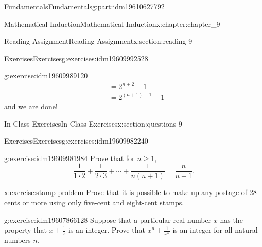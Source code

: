\documentclass[oneside,10pt,]{book}
\numberwithin{equation}{section}
\begin{document}
\begin{partptx}{Fundamentals}{}{Fundamentals}{}{}{g:part:idm19610627792}
\begin{chapterptx}{Mathematical Induction}{}{Mathematical Induction}{}{}{x:chapter:chapter_9}
\begin{sectionptx}{Reading Assignment}{}{Reading Assignment}{}{}{x:section:reading-9}
\begin{exercises-subsection-numberless}{Exercises}{}{Exercises}{}{}{g:exercises:idm19609992528}
\begin{exercisegroup}
\begin{divisionexerciseeg}{2}{}{}{g:exercise:idm19609989120}
\begin{equation*}
\begin{split}
&= 2^{n+2}-1\\ 
&= 2^{(n+1)+1}-1
\end{split}
\end{equation*}
and we are done!%
\end{divisionexerciseeg}%
\end{exercisegroup}
\par\medskip\noindent
\end{exercises-subsection-numberless}
\end{sectionptx}
%
%
\typeout{************************************************}
\typeout{************************************************}
%
\begin{sectionptx}{In-Class Exercises}{}{In-Class Exercises}{}{}{x:section:questions-9}
%
%
%
\typeout{************************************************}
\typeout{************************************************}
%
\begin{exercises-subsection-numberless}{Exercises}{}{Exercises}{}{}{g:exercises:idm19609982240}
\par\medskip\noindent%
%
\begin{exercisegroup}
\begin{divisionexerciseeg}{1}{}{}{g:exercise:idm19609981984}%
Prove that for \(n\geq 1\),%
\begin{equation*}
\frac{1}{1\cdot 2 }+ \frac{1}{2\cdot 3}+ \cdots  + \frac{1}{n(n+1)}= \frac{n}{n+1}.
\end{equation*}
%
\end{divisionexerciseeg}%
\begin{divisionexerciseeg}{2}{}{}{x:exercise:stamp-problem}%
Prove that it is possible to make up any postage of 28 cents or more using only five-cent and eight-cent stamps.%
\end{divisionexerciseeg}%
\begin{divisionexerciseeg}{3}{}{}{g:exercise:idm19607866128}%
Suppose that a particular real number \(x\) has the property that \(x + \frac{1}{x}\) is an integer.  Prove that \(x^n + \frac{1}{x^n}\) is an integer for all natural numbers \(n\).%
\end{divisionexerciseeg}%
\end{exercisegroup}
\par\medskip\noindent
\end{exercises-subsection-numberless}
\end{sectionptx}
\end{chapterptx}
%
\typeout{************************************************}

\end{partptx}
\end{document}

